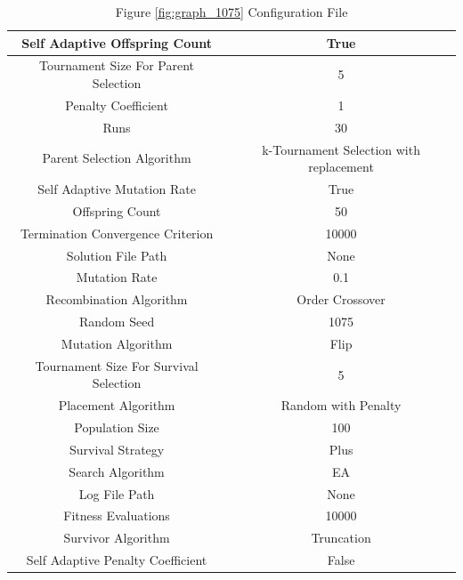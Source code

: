 \documentclass{standalone}
\begin{document}
\begin{table}[!htb]
	\centering
	\caption{Figure \ref{fig:graph_1075} Configuration File}
	\label{tab:graph_1075}
	\begin{tabular}{| c | c |}
		\hline
		Self Adaptive Offspring Count		& True		 \\
		\hline
		Tournament Size For Parent Selection		& 5		 \\
		\hline
		Penalty Coefficient		& 1		 \\
		\hline
		Runs		& 30		 \\
		\hline
		Parent Selection Algorithm		& k-Tournament Selection with replacement		 \\
		\hline
		Self Adaptive Mutation Rate		& True		 \\
		\hline
		Offspring Count		& 50		 \\
		\hline
		Termination Convergence Criterion		& 10000		 \\
		\hline
		Solution File Path		& None		 \\
		\hline
		Mutation Rate		& 0.1		 \\
		\hline
		Recombination Algorithm		& Order Crossover		 \\
		\hline
		Random Seed		& 1075		 \\
		\hline
		Mutation Algorithm		& Flip		 \\
		\hline
		Tournament Size For Survival Selection		& 5		 \\
		\hline
		Placement Algorithm		& Random with Penalty		 \\
		\hline
		Population Size		& 100		 \\
		\hline
		Survival Strategy		& Plus		 \\
		\hline
		Search Algorithm		& EA		 \\
		\hline
		Log File Path		& None		 \\
		\hline
		Fitness Evaluations		& 10000		 \\
		\hline
		Survivor Algorithm		& Truncation		 \\
		\hline
		Self Adaptive Penalty Coefficient		& False		 \\
		\hline
	\end{tabular}
\end{table}
\end{document}

